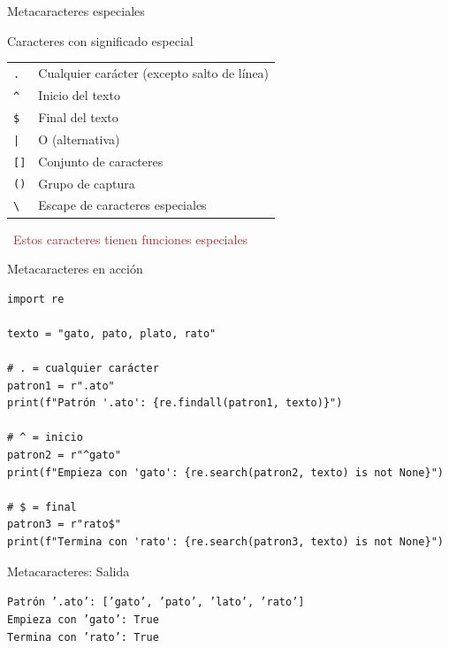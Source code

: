 \documentclass{beamer}
\begin{document}
\begin{frame}{Metacaracteres especiales \faMagic}
\begin{conceptbox}{Caracteres con significado especial}
\small
\begin{tabular}{ll}
\texttt{.} & Cualquier carácter (excepto salto de línea) \\
\texttt{\^} & Inicio del texto \\
\texttt{\$} & Final del texto \\
\texttt{|} & O (alternativa) \\
\texttt{[]} & Conjunto de caracteres \\
\texttt{()} & Grupo de captura \\
\texttt{\textbackslash} & Escape de caracteres especiales \\
\end{tabular}
\end{conceptbox}

\vspace{0.2cm}
\begin{center}
\textcolor{brown}{\faInfoCircle\ Estos caracteres tienen funciones especiales}
\end{center}
\end{frame}

\begin{frame}[fragile]{Metacaracteres en acción \faPlayCircle}
\begin{lstlisting}
import re

texto = "gato, pato, plato, rato"

# . = cualquier carácter
patron1 = r".ato"
print(f"Patrón '.ato': {re.findall(patron1, texto)}")

# ^ = inicio
patron2 = r"^gato"
print(f"Empieza con 'gato': {re.search(patron2, texto) is not None}")

# $ = final
patron3 = r"rato$"
print(f"Termina con 'rato': {re.search(patron3, texto) is not None}")
\end{lstlisting}
\end{frame}

\begin{frame}[fragile]{Metacaracteres: Salida \faArrowCircleRight}
\begin{tcolorbox}[colback=green!10,colframe=green,title={\small\faArrowCircleRight \ Salida},coltitle=fg0,left=3pt,right=3pt,top=3pt,bottom=3pt,boxsep=2pt]
\small\texttt{Patrón '.ato': ['gato', 'pato', 'lato', 'rato']\\
Empieza con 'gato': True\\
Termina con 'rato': True}
\end{tcolorbox}
\end{frame}
\end{document}

